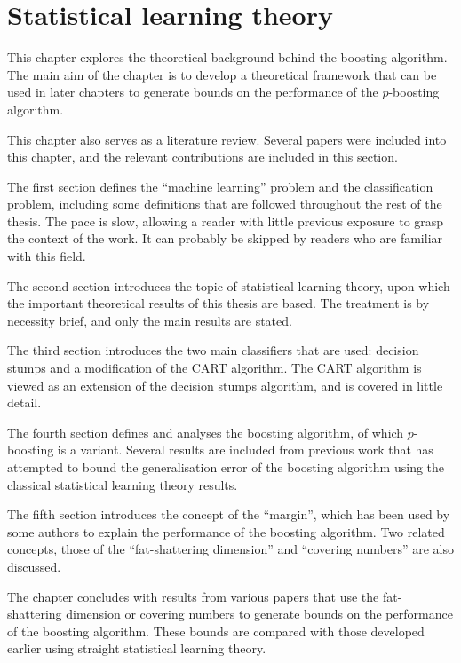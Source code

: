 

\chapter{Statistical learning theory}
\label{chapter:slt}

This chapter explores the theoretical background behind the
boosting algorithm.  The main aim of the chapter is to develop a
theoretical framework that can be used in later chapters to generate
bounds on the performance of the $p$-boosting algorithm.

This chapter also serves as a literature review.  Several papers were
included into this chapter, and the relevant contributions are
included in this section.

The first section defines the ``machine learning'' problem and
the classification problem, including some definitions that are
followed throughout the rest of the thesis.  The pace is slow,
allowing a reader with little previous exposure to grasp the context
of the work.  It can probably be skipped by readers who are familiar
with this field.

The second section introduces the topic of statistical learning theory,
upon which the important theoretical results of this thesis are based.
The treatment is by necessity brief, and only the main results are
stated.

The third section introduces the two main classifiers that are used:
decision stumps and a modification of the CART algorithm.  The CART
algorithm is viewed as an extension of the decision stumps algorithm,
and is covered in little detail.

The fourth section defines and analyses the boosting algorithm, of
which $p$-boosting is a variant.  Several results are included from
previous work that has attempted to bound the generalisation error of
the boosting algorithm using the classical statistical learning theory
results.

The fifth section introduces the concept of the ``margin'', which has
been used by some authors to explain the performance of the boosting
algorithm.  Two related concepts, those of the ``fat-shattering
dimension'' and ``covering numbers'' are also discussed.

The chapter concludes with results from various papers that use the
fat-shattering dimension or covering numbers to generate bounds on the
performance of the boosting algorithm.  These bounds are compared with
those developed earlier using straight statistical learning theory.




